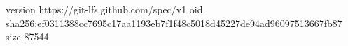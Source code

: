 version https://git-lfs.github.com/spec/v1
oid sha256:ef0311388cc7695c17aa1193eb7f1f48c5018d45227de94ad96097513667fb87
size 87544

